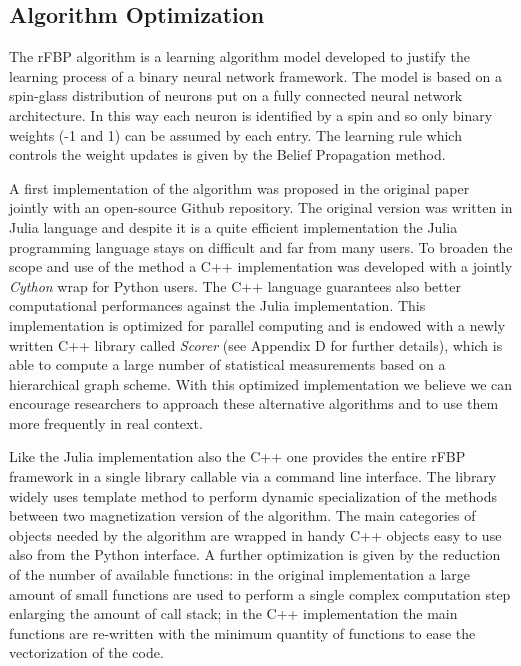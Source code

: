 \documentclass{standalone}
\begin{document}
\subsection[Algorithm Optimization]{Algorithm Optimization}\label{rfbp:rFBP}

The rFBP algorithm is a learning algorithm model developed to justify the learning process of a binary neural network framework.
The model is based on a spin-glass distribution of neurons put on a fully connected neural network architecture.
In this way each neuron is identified by a spin and so only binary weights (-1 and 1) can be assumed by each entry.
The learning rule which controls the weight updates is given by the Belief Propagation method.

A first implementation of the algorithm was proposed in the original paper~\cite{BaldassiE7655} jointly with an open-source Github repository.
The original version was written in Julia language and despite it is a quite efficient implementation the Julia programming language stays on difficult and far from many users.
To broaden the scope and use of the method a C++ implementation was developed with a jointly \emph{Cython} wrap for Python users.
The C++ language guarantees also better computational performances against the Julia implementation.
This implementation is optimized for parallel computing and is endowed with a newly written C++ library called \emph{Scorer} (see Appendix D for further details), which is able to compute a large number of statistical measurements based on a hierarchical graph scheme.
With this optimized implementation we believe we can encourage researchers to approach these alternative algorithms and to use them more frequently in real context.

Like the Julia implementation also the C++ one provides the entire rFBP framework in a single library callable via a command line interface.
The library widely uses template method to perform dynamic specialization of the methods between two magnetization version of the algorithm.
The main categories of objects needed by the algorithm are wrapped in handy C++ objects easy to use also from the Python interface.
A further optimization is given by the reduction of the number of available functions: in the original implementation a large amount of small functions are used to perform a single complex computation step enlarging the amount of call stack; in the C++ implementation the main functions are re-written with the minimum quantity of functions to ease the vectorization of the code.
\end{document}
